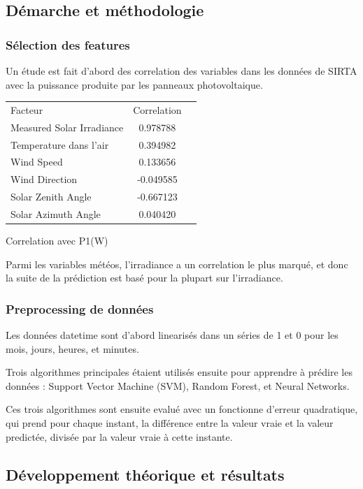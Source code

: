 \documentclass[a4paper]{article}
\begin{document}
\begin{multicols}{2}

\subsection{Démarche et méthodologie}
\subsubsection{Sélection des features}
Un étude est fait d’abord des correlation des variables dans les données de SIRTA avec la puissance produite par les panneaux photovoltaique. 


\begin{tabular}{l c r}
  Facteur & Correlation \\
  Measured Solar Irradiance & 0.978788 \\
  Temperature dans l’air & 0.394982 \\
  Wind Speed & 0.133656 \\
  Wind Direction & -0.049585 \\
  Solar Zenith Angle & -0.667123 \\
  Solar Azimuth Angle & 0.040420 \\
\end{tabular}
\tablename{ Correlation avec P1(W)}

Parmi les variables météos, l’irradiance a un correlation le plus marqué, et donc la suite de la prédiction est basé pour la plupart sur l’irradiance.

\subsubsection{Preprocessing de données}

Les données datetime sont d'abord linearisés dans un séries de 1 et 0 pour les mois, jours, heures, et minutes. 

Trois algorithmes principales étaient utilisés ensuite pour apprendre à prédire les données : Support Vector Machine (SVM), Random Forest, et Neural Networks.

Ces trois algorithmes sont ensuite evalué avec un fonctionne d'erreur quadratique, qui prend pour chaque instant, la différence entre la valeur vraie et la valeur predictée, divisée par la valeur vraie à cette instante. 

\subsection{Développement théorique et résultats}

\end{multicols}
\end{document}
